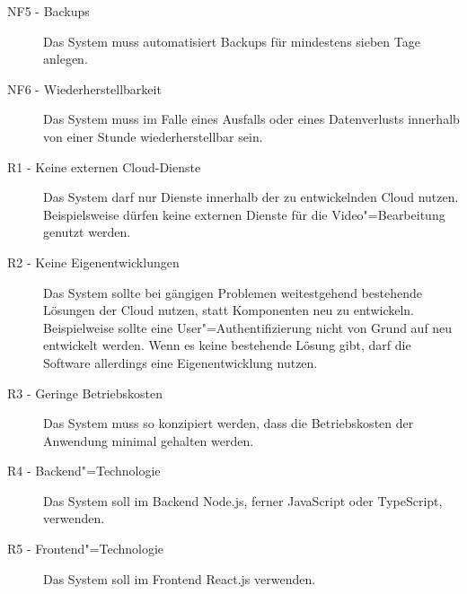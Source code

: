 \begin{description}
   \item[NF5 - Backups] Das System muss automatisiert Backups für mindestens sieben Tage anlegen.\label{NF6}
   \item[NF6 - Wiederherstellbarkeit] Das System muss im Falle eines Ausfalls oder eines Datenverlusts innerhalb von einer Stunde wiederherstellbar sein.\label{NF7}
   \item[R1 - Keine externen Cloud-Dienste] Das System darf nur Dienste innerhalb der zu entwickelnden Cloud nutzen. Beispielsweise dürfen keine externen Dienste für die Video"=Bearbeitung genutzt werden.
   \item[R2 - Keine Eigenentwicklungen] Das System sollte bei gängigen Problemen weitestgehend bestehende Lösungen der Cloud nutzen, statt Komponenten neu zu entwickeln. Beispielweise sollte eine User"=Authentifizierung nicht von Grund auf neu entwickelt werden. Wenn es keine bestehende Lösung gibt, darf die Software allerdings eine Eigenentwicklung nutzen.
   \item[R3 - Geringe Betriebskosten] Das System muss so konzipiert werden, dass die Betriebskosten der Anwendung minimal gehalten werden.
   \item[R4 - Backend"=Technologie] Das System soll im Backend Node.js, ferner JavaScript oder TypeScript, verwenden.
   \item[R5 - Frontend"=Technologie] Das System soll im Frontend React.js verwenden.
\end{description}